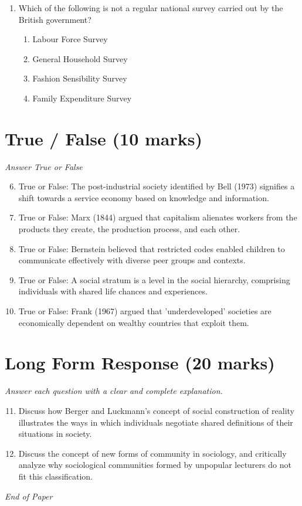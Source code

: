 \documentclass[12pt]{article}
\begin{document}
\begin{enumerate}[label=\arabic*.]
\begin{enumerate}[label=(\alph*)]
    \item Functionalism
    \item Conflict theory
    \item Symbolic interactionism
    \item Role theory
\end{enumerate}
\item Which of the following is not a regular national survey carried out by the British government?
\begin{enumerate}[label=(\alph*)]
    \item Labour Force Survey
    \item General Household Survey
    \item Fashion Sensibility Survey
    \item Family Expenditure Survey
\end{enumerate}
\end{enumerate}

\section*{True / False (10 marks)}
\textit{Answer True or False}
\begin{enumerate}[label=\arabic*.]
\setcounter{enumi}{5}
\item True or False: The post-industrial society identified by Bell (1973) signifies a shift towards a service economy based on knowledge and information.
\item True or False: Marx (1844) argued that capitalism alienates workers from the products they create, the production process, and each other.
\item True or False: Bernstein believed that restricted codes enabled children to communicate effectively with diverse peer groups and contexts.
\item True or False: A social stratum is a level in the social hierarchy, comprising individuals with shared life chances and experiences.
\item True or False: Frank (1967) argued that 'underdeveloped' societies are economically dependent on wealthy countries that exploit them.
\end{enumerate}

\section*{Long Form Response (20 marks)}
\textit{Answer each question with a clear and complete explanation.}
\begin{enumerate}[label=\arabic*.]
\setcounter{enumi}{10}
\item Discuss how Berger and Luckmann's concept of social construction of reality illustrates the ways in which individuals negotiate shared definitions of their situations in society.
\item Discuss the concept of new forms of community in sociology, and critically analyze why sociological communities formed by unpopular lecturers do not fit this classification.
\end{enumerate}

\vfill
\noindent\textit{End of Paper}
\end{document}
